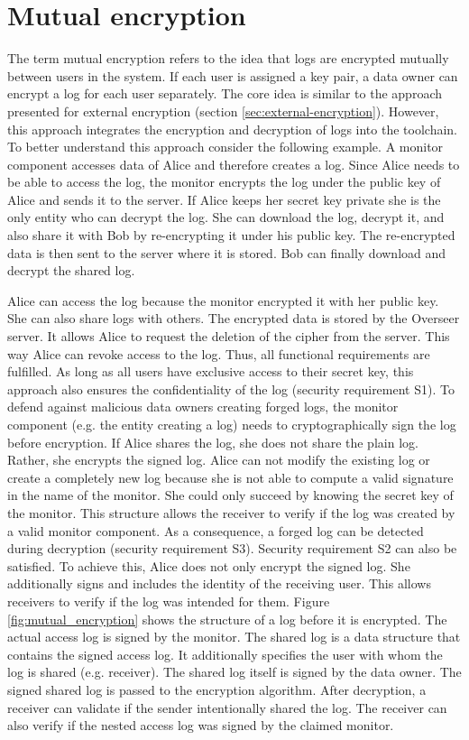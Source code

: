 \documentclass[../main.tex]{subfiles}
\begin{document}
\section{Mutual encryption}
\label{sec:mutual-encryption}
The term mutual encryption refers to the idea that logs are encrypted mutually between users in the system.
If each user is assigned a key pair, a data owner can encrypt a log for each user separately.
The core idea is similar to the approach presented for external encryption (section \ref{sec:external-encryption}).
However, this approach integrates the encryption and decryption of logs into the toolchain.
To better understand this approach consider the following example.
A monitor component accesses data of Alice and therefore creates a log.
Since Alice needs to be able to access the log, the monitor encrypts the log under the public key of Alice and sends it to the server.
If Alice keeps her secret key private she is the only entity who can decrypt the log.
She can download the log, decrypt it, and also share it with Bob by re-encrypting it under his public key.
The re-encrypted data is then sent to the server where it is stored.
Bob can finally download and decrypt the shared log.

Alice can access the log because the monitor encrypted it with her public key.
She can also share logs with others.
The encrypted data is stored by the Overseer server.
It allows Alice to request the deletion of the cipher from the server.
This way Alice can revoke access to the log.
Thus, all functional requirements are fulfilled.
As long as all users have exclusive access to their secret key, this approach also ensures the confidentiality of the log (security requirement S1).
To defend against malicious data owners creating forged logs, the monitor component (e.g. the entity creating a log) needs to cryptographically sign the log before encryption.
If Alice shares the log, she does not share the plain log.
Rather, she encrypts the signed log.
Alice can not modify the existing log or create a completely new log because she is not able to compute a valid signature in the name of the monitor.
She could only succeed by knowing the secret key of the monitor.
This structure allows the receiver to verify if the log was created by a valid monitor component.
As a consequence, a forged log can be detected during decryption (security requirement S3).
Security requirement S2 can also be satisfied.
To achieve this, Alice does not only encrypt the signed log.
She additionally signs and includes the identity of the receiving user.
This allows receivers to verify if the log was intended for them.
Figure \ref{fig:mutual_encryption} shows the structure of a log before it is encrypted.
The actual access log is signed by the monitor.
The shared log is a data structure that contains the signed access log.
It additionally specifies the user with whom the log is shared (e.g. receiver).
The shared log itself is signed by the data owner.
The signed shared log is passed to the encryption algorithm.
After decryption, a receiver can validate if the sender intentionally shared the log.
The receiver can also verify if the nested access log was signed by the claimed monitor.
\end{document}

